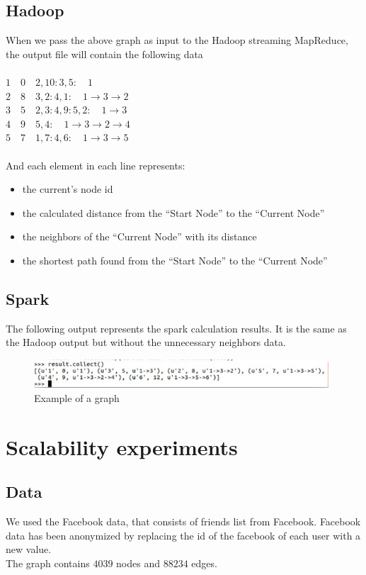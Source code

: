 \documentclass[english]{article}
\begin{document}
\subsection{Hadoop}
When we pass the above graph as input to the Hadoop streaming MapReduce, the output file will contain the following data\\
$ $\\
$ 1\quad  0\quad 2,10:3,5:\quad 1$\\
$ 2 \quad 8\quad 3,2:4,1: \quad1\rightarrow3\rightarrow2$\\	
$ 3\quad  5 \quad2,3:4,9:5,2: \quad1\rightarrow3$\\	
$ 4 \quad 9 \quad5,4: \quad 1\rightarrow3\rightarrow2\rightarrow4$\\	
$ 5 \quad 7 \quad1,7:4,6: \quad1\rightarrow3\rightarrow5$\\
$ $\\
And each element in each line represents:
\begin{itemize}
\item the current’s node id
\item the calculated distance from the “Start Node” to the “Current Node”
\item the neighbors of the “Current Node” with its distance
\item the shortest path found from the “Start Node” to the “Current Node”
\end{itemize}

\subsection{Spark}
The following output represents the spark calculation results. It is the same as the Hadoop output but without the unnecessary neighbors data.\\
\begin{figure}[h]
\centering
\includegraphics[width=11cm]{img/spark.png}
\caption{Example of a graph}
\end{figure}

\section{Scalability experiments}
\subsection{Data}
We used the Facebook data, that consists of friends list from Facebook. Facebook data has been anonymized by replacing the id of the facebook of each user with a new value.\\
The graph contains $4039$ nodes and $88234$ edges. \\
\end{document}
